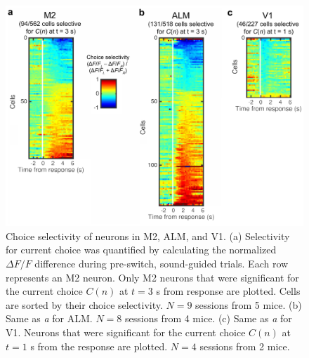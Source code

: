 \begin{figure}[htbp]

\begin{center}
\includegraphics[width=\textwidth]{Figures/Chapter3/NN_figS8.jpg} 
\end{center}

\caption[Choice selectivity of neurons in M2, ALM, and V1]
{
Choice selectivity of neurons in M2, ALM, and V1.
(a) Selectivity for current choice was quantified by calculating the normalized $\Delta F/F$ difference during pre-switch, sound-guided trials. Each row represents an M2 neuron. Only M2 neurons that were significant for the current choice $C(n)$ at $t=3$ s from response are plotted. Cells are sorted by their choice selectivity. $N=9$ sessions from 5 mice. (b) Same as \emph{a} for ALM. $N=8$ sessions from 4 mice. (c) Same as \emph{a} for V1. Neurons that were significant for the current choice $C(n)$ at $t=1$ s from the response are plotted. $N=4$ sessions from 2 mice.
}

\label{fig:NN_figS8}
\end{figure}